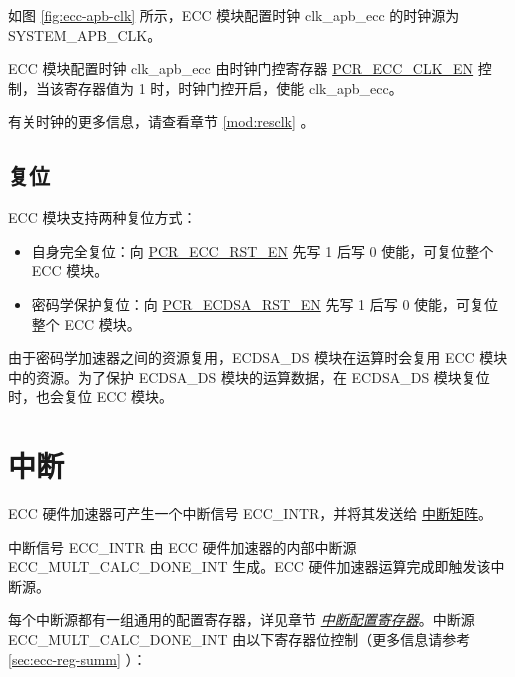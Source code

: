 \documentclass[main\_\_CN.tex]{subfiles}
\begin{document}
如图 \ref{fig:ecc-apb-clk} \textit{} 所示，ECC 模块配置时钟 clk\_apb\_ecc 的时钟源为 SYSTEM\_APB\_CLK。

ECC 模块配置时钟 clk\_apb\_ecc 由时钟门控寄存器 \hyperref[fielddesc:PCRECCCLKEN]{PCR\_ECC\_CLK\_EN} 控制，当该寄存器值为 1 时，时钟门控开启，使能 clk\_apb\_ecc。

有关时钟的更多信息，请查看章节 \ref{mod:resclk} \textit{}。


\subsection{复位}
\label{sec:ecc-reset}

ECC 模块支持两种复位方式：

\begin{itemize}
    \item 自身完全复位：向 \hyperref[fielddesc:PCRECCRSTEN]{PCR\_ECC\_RST\_EN} 先写 1 后写 0 使能，可复位整个 ECC 模块。
    \item 密码学保护复位：向 \hyperref[fielddesc:PCRECDSARSTEN]{PCR\_ECDSA\_RST\_EN} 先写 1 后写 0 使能，可复位整个 ECC 模块。
\end{itemize}

\begin{tiplisting}
由于密码学加速器之间的资源复用，ECDSA\_DS 模块在运算时会复用 ECC 模块中的资源。为了保护 ECDSA\_DS 模块的运算数据，在 ECDSA\_DS 模块复位时，也会复位 ECC 模块。
\end{tiplisting}



\section{中断}
\label{sec:ecc-interrupt}

\chipname{} ECC 硬件加速器可产生一个中断信号 ECC\_INTR，并将其发送给 \hyperref[mod:intmtrx]{中断矩阵}。

中断信号 ECC\_INTR 由 ECC 硬件加速器的内部中断源 \label{int:ECCMULTCALCDONEINT}{ECC\_MULT\_CALC\_DONE\_INT} 生成。ECC 硬件加速器运算完成即触发该中断源。

每个中断源都有一组通用的配置寄存器，详见章节 \hyperref[interrupt-config-registers]{\textit{中断配置寄存器}}。中断源 ECC\_MULT\_CALC\_DONE\_INT 由以下寄存器位控制（更多信息请参考 \ref{sec:ecc-reg-summ} \textit{}）：
\end{document}
